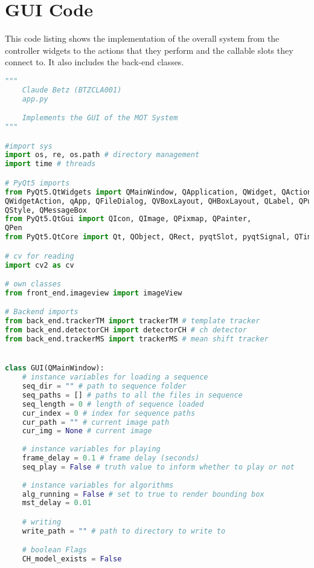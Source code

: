 \newpage
\section{GUI Code}\label{appendix_gui}
This code listing shows the implementation of the overall system from the controller
widgets to the actions that they perform and the callable slots they connect to.
It also includes the back-end classes. 

\begin{lstlisting}[language=Python, caption={GUI Impementation Code}, captionpos=b, label={lst:gui}]
"""
    Claude Betz (BTZCLA001)
    app.py

    Implements the GUI of the MOT System
"""

#import sys
import os, re, os.path # directory management
import time # threads

# PyQt5 imports
from PyQt5.QtWidgets import QMainWindow, QApplication, QWidget, QAction,
QWidgetAction, qApp, QFileDialog, QVBoxLayout, QHBoxLayout, QLabel, QPushButton,
QStyle, QMessageBox 
from PyQt5.QtGui import QIcon, QImage, QPixmap, QPainter,
QPen
from PyQt5.QtCore import Qt, QObject, QRect, pyqtSlot, pyqtSignal, QTimer 

# cv for reading
import cv2 as cv

# own classes
from front_end.imageview import imageView

# Backend imports 
from back_end.trackerTM import trackerTM # template tracker 
from back_end.detectorCH import detectorCH # ch detector
from back_end.trackerMS import trackerMS # mean shift tracker


class GUI(QMainWindow):
    # instance variables for loading a sequence
    seq_dir = "" # path to sequence folder
    seq_paths = [] # paths to all the files in sequence
    seq_length = 0 # length of sequence loaded
    cur_index = 0 # index for sequence paths
    cur_path = "" # current image path 
    cur_img = None # current image 
    
    # instance variables for playing 
    frame_delay = 0.1 # frame delay (seconds)
    seq_play = False # truth value to inform whether to play or not
    
    # instance variables for algorithms
    alg_running = False # set to true to render bounding box
    mst_delay = 0.01

    # writing 
    write_path = "" # path to directory to write to 

    # boolean Flags
    CH_model_exists = False


\end{lstlisting}
